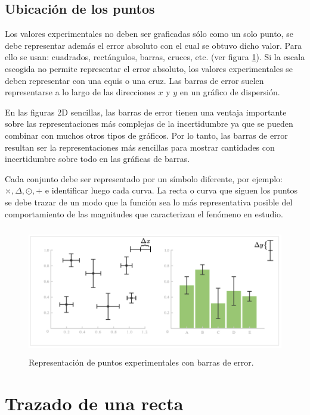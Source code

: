 \subsection{Ubicaci\'on de los puntos}

Los valores experimentales no deben ser graficadas s\'olo como un solo punto, se debe representar adem\'as el error absoluto con el cual se obtuvo dicho valor. Para ello se usan: cuadrados, rect\'angulos, barras, cruces, etc. (ver figura \ref{barerror}). Si la escala escogida no permite representar el error absoluto, los valores experimentales se deben representar con una equis o una cruz. Las barras de error suelen representarse a lo largo de las direcciones $x$ y  $y$ en un gr\'afico de dispersi\'on.

En las figuras 2D sencillas, las barras de error tienen una ventaja importante sobre las representaciones m\'as complejas de la incertidumbre ya que se pueden combinar con muchos otros tipos de gr\'aficos. Por lo tanto, las barras de error resultan ser la representaciones m\'as sencillas para mostrar cantidades con incertidumbre sobre todo en las gr\'aficas de barras. 

Cada conjunto debe ser representado por un s\'imbolo diferente, por ejemplo: $\times, \Delta, \odot,+$ e identificar luego cada curva. La recta o curva que siguen los puntos se debe trazar de un modo que la funci\'on sea lo m\'as representativa posible del comportamiento de las magnitudes que caracterizan el fen\'omeno  en estudio.
\begin{figure}[h]
\begin{center}
\includegraphics[height=2.2in,width=4.6in]{figuras/fig11}  
\caption{Representaci\'on de puntos experimentales con barras de error.}
\label{barerror}
\end{center}
\end{figure}


\section{Trazado de una recta}

